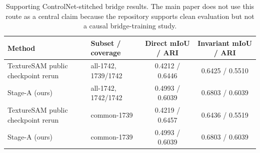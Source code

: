\begin{table}[t]
\centering
\scriptsize
\begin{tabularx}{\textwidth}{@{}Xlcc@{}}
\toprule
Method & Subset / coverage & Direct mIoU / ARI & Invariant mIoU / ARI \\
\midrule
TextureSAM public checkpoint rerun & all-1742, 1739/1742 & 0.4212 / 0.6446 & 0.6425 / 0.5510 \\
\sys{} Stage-A (ours) & all-1742, 1742/1742 & 0.4993 / 0.6039 & 0.6803 / 0.6039 \\
TextureSAM public checkpoint rerun & common-1739 & 0.4219 / 0.6457 & 0.6436 / 0.5519 \\
\sys{} Stage-A (ours) & common-1739 & 0.4993 / 0.6039 & 0.6803 / 0.6039 \\
\bottomrule
\end{tabularx}
\caption{Supporting ControlNet-stitched bridge results. The main paper does not use this route as a central claim because the repository supports clean evaluation but not a causal bridge-training study.}
\label{tab:controlnet_secondary}
\end{table}
